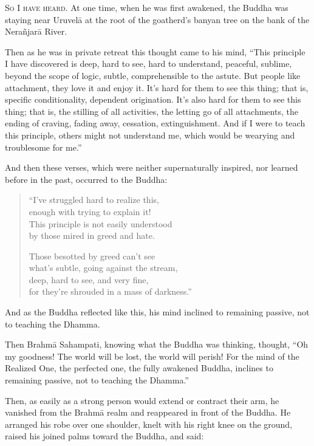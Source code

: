 \documentclass[12pt,openany]{book}%
\newcommand*{\scevam}[1]{\textsc{#1}}
\begin{document}
\scevam{So I have heard. }At one time, when he was first awakened, the Buddha was staying near \textsanskrit{Uruvelā} at the root of the goatherd’s banyan tree on the bank of the \textsanskrit{Nerañjarā} River. 

Then as he was in private retreat this thought came to his mind, “This principle I have discovered is deep, hard to see, hard to understand, peaceful, sublime, beyond the scope of logic, subtle, comprehensible to the astute. But people like attachment, they love it and enjoy it. It’s hard for them to see this thing; that is, specific conditionality, dependent origination. It’s also hard for them to see this thing; that is, the stilling of all activities, the letting go of all attachments, the ending of craving, fading away, cessation, extinguishment. And if I were to teach this principle, others might not understand me, which would be wearying and troublesome for me.” 

And then these verses, which were neither supernaturally inspired, nor learned before in the past, occurred to the Buddha: 

\begin{verse}%
“I’ve struggled hard to realize this, \\
enough with trying to explain it! \\
This principle is not easily understood \\
by those mired in greed and hate. 

Those besotted by greed can’t see \\
what’s subtle, going against the stream, \\
deep, hard to see, and very fine, \\
for they’re shrouded in a mass of darkness.” 

%
\end{verse}

And as the Buddha reflected like this, his mind inclined to remaining passive, not to teaching the Dhamma. 

Then \textsanskrit{Brahmā} Sahampati, knowing what the Buddha was thinking, thought, “Oh my goodness! The world will be lost, the world will perish! For the mind of the Realized One, the perfected one, the fully awakened Buddha, inclines to remaining passive, not to teaching the Dhamma.” 

Then, as easily as a strong person would extend or contract their arm, he vanished from the \textsanskrit{Brahmā} realm and reappeared in front of the Buddha. He arranged his robe over one shoulder, knelt with his right knee on the ground, raised his joined palms toward the Buddha, and said: 
\end{document}

